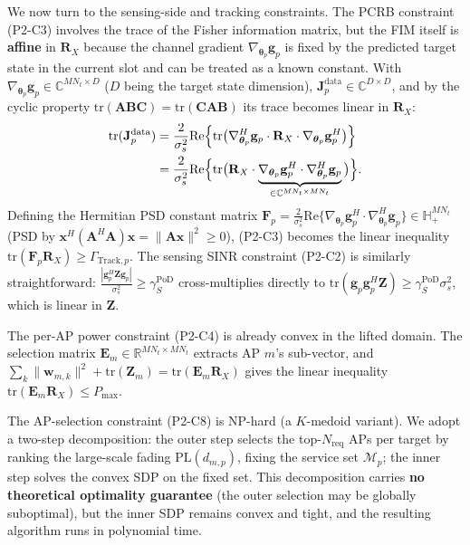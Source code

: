 \documentclass[12pt,a4paper]{article}
\newcommand{\vect}[1]{\mathbf{#1}}
\newcommand{\mat}[1]{\mathbf{#1}}
\newcommand{\tr}{\text{tr}}
\newcommand{\Real}{\text{Re}}
\begin{document}
We now turn to the sensing-side and tracking constraints. The PCRB constraint (P2-C3) involves the trace of the Fisher information matrix, but the FIM itself is \textbf{affine} in $\mat{R}_X$ because the channel gradient $\nabla_{\boldsymbol{\theta}_p} \vect{g}_p$ is fixed by the predicted target state in the current slot and can be treated as a known constant. With $\nabla_{\boldsymbol{\theta}_p} \vect{g}_p \in \mathbb{C}^{MN_t \times D}$ ($D$ being the target state dimension), $\mat{J}_p^{\text{data}} \in \mathbb{C}^{D \times D}$, and by the cyclic property $\tr(\mat{A}\mat{B}\mat{C}) = \tr(\mat{C}\mat{A}\mat{B})$ its trace becomes linear in $\mat{R}_X$:
\begin{align}
\tr(\mat{J}_p^{\text{data}}) &= \frac{2}{\sigma_s^2} \Real\Big\{ \tr\big(\nabla_{\boldsymbol{\theta}_p}^H \vect{g}_p \cdot \mat{R}_X \cdot \nabla_{\boldsymbol{\theta}_p} \vect{g}_p^H\big) \Big\} \notag \\
&= \frac{2}{\sigma_s^2} \Real\Big\{ \tr\big(\mat{R}_X \cdot \underbrace{\nabla_{\boldsymbol{\theta}_p} \vect{g}_p^H \cdot \nabla_{\boldsymbol{\theta}_p}^H \vect{g}_p}_{\in \mathbb{C}^{MN_t \times MN_t}}\big) \Big\}.
\end{align}
Defining the Hermitian PSD constant matrix $\mat{F}_p = \frac{2}{\sigma_s^2} \Real\{\nabla_{\boldsymbol{\theta}_p} \vect{g}_p^H \cdot \nabla_{\boldsymbol{\theta}_p}^H \vect{g}_p\} \in \mathbb{H}_+^{MN_t}$ (PSD by $\vect{x}^H(\mat{A}^H\mat{A})\vect{x} = \|\mat{A}\vect{x}\|^2 \geq 0$), (P2-C3) becomes the linear inequality $\tr(\mat{F}_p \mat{R}_X) \geq \Gamma_{\text{Track},p}$. The sensing SINR constraint (P2-C2) is similarly straightforward: $\frac{|\vect{g}_p^H \mat{Z} \vect{g}_p|}{\sigma_s^2} \geq \gamma_S^{\text{PoD}}$ cross-multiplies directly to $\tr(\vect{g}_p \vect{g}_p^H \mat{Z}) \geq \gamma_S^{\text{PoD}} \sigma_s^2$, which is linear in $\mat{Z}$.

The per-AP power constraint (P2-C4) is already convex in the lifted domain. The selection matrix $\mat{E}_m \in \mathbb{R}^{MN_t \times MN_t}$ extracts AP $m$'s sub-vector, and $\sum_k \|\vect{w}_{m,k}\|^2 + \tr(\mat{Z}_m) = \tr(\mat{E}_m \mat{R}_X)$ gives the linear inequality $\tr(\mat{E}_m \mat{R}_X) \leq P_{\max}$.

The AP-selection constraint (P2-C8) is NP-hard (a $K$-medoid variant). We adopt a two-step decomposition: the outer step selects the top-$N_{\text{req}}$ APs per target by ranking the large-scale fading $\text{PL}(d_{m,p})$, fixing the service set $\mathcal{M}_p$; the inner step solves the convex SDP on the fixed set. This decomposition carries \textbf{no theoretical optimality guarantee} (the outer selection may be globally suboptimal), but the inner SDP remains convex and tight, and the resulting algorithm runs in polynomial time.
\end{document}
